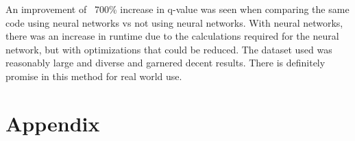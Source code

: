 \documentclass[12pt]{ucthesis}
\begin{document}
An improvement of ~700\% increase in q-value was seen when comparing the same code using neural networks vs not using neural networks. With neural networks, there was an increase in runtime due to the calculations required for the neural network, but with optimizations that could be reduced. The dataset used was reasonably large and diverse and garnered decent results. There is definitely promise in this method for real world use. 








\clearpage



\chapter{Appendix}
\end{document}

